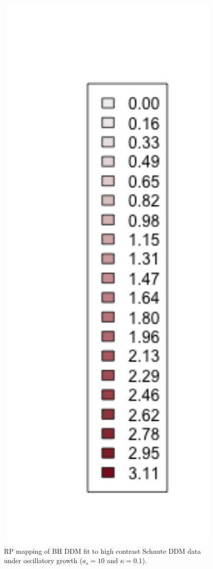 \begin{figure}
\begin{minipage}[h!]{0.06\textwidth}
\includegraphics[width=1.7\textwidth]{../gpBias/legendSubSchnute.png}
\end{minipage}

\vspace{-0.75cm}
\caption{RP mapping of BH DDM fit to high contrast Schnute DDM data under oscillatory growth ($a_s=10$ and $\kappa=0.1$).
}\label{oscillationArrow}
\end{figure}

